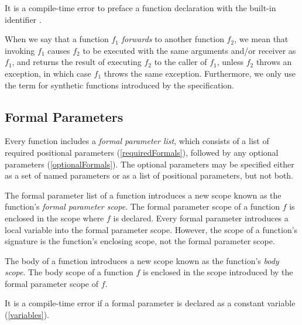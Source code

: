 \documentclass{article}
\begin{document}
\LMHash{}
It is a compile-time error to preface a function declaration with the built-in identifier \STATIC{}.

\LMHash{}
When we say that a function $f_1$ {\em forwards} to another function $f_2$, we mean that invoking $f_1$ causes $f_2$ to be executed with the same arguments and/or receiver as $f_1$, and returns the result of executing $f_2$ to the caller of $f_1$, unless $f_2$ throws an exception, in which case $f_1$ throws the same exception.
Furthermore, we only use the term for synthetic functions introduced by the specification.


\subsection{Formal Parameters}

\LMHash{}
Every function includes a {\em formal parameter list}, which consists of a list of required positional parameters (\ref{requiredFormals}), followed by any optional parameters (\ref{optionalFormals}).
The optional parameters may be specified either as a set of named parameters or as a list of positional parameters, but not both.

\LMHash{}
The formal parameter list of a function introduces a new scope known as the function's {\em formal parameter scope}.
The formal parameter scope of a function $f$ is enclosed in the scope where $f$ is declared.
Every formal parameter introduces a local variable into the formal parameter scope.
However, the scope of a function's signature is the function's enclosing scope, not the formal parameter scope.

\LMHash{}
The body of a function introduces a new scope known as the function's {\em body scope}.
The body scope of a function $f$ is enclosed in the scope introduced by the formal parameter scope of $f$.



\LMHash{}
It is a compile-time error if a formal parameter is declared as a constant variable (\ref{variables}).
\end{document}
